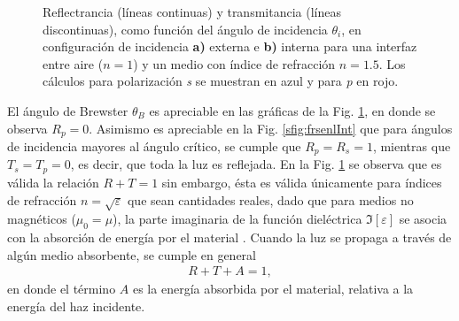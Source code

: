 \begin{figure}[h!]
\begin{subfigure}{.43\textwidth}
	\end{subfigure}\vspace*{-.7em}
	\caption{  Reflectrancia (líneas continuas) y transmitancia (líneas discontinuas), como función del ángulo de incidencia $\theta_i$, en configuración de incidencia \textbf{a)} externa e \textbf{b)} interna para una interfaz entre  aire ($n=1$) y un medio con índice de refracción $n = 1.5$. Los cálculos para polarización  \emph{s} se muestran  en azul y  para \emph{p} en rojo.}	\label{fig:frsnel}	
	\end{figure}	
%

El ángulo de Brewster $\theta_B$ es apreciable en las gráficas de la Fig. \ref{fig:frsnel}, en donde se observa $R_p = 0$. Asimismo es apreciable en la Fig. \ref{sfig:frsenlInt} que para ángulos de incidencia mayores al ángulo crítico, se cumple que $R_p = R_s = 1$, mientras que $T_s = T_p = 0$, es decir, que toda la luz es reflejada. En la Fig. \ref{fig:frsnel} se observa que es válida la relación $R + T = 1$ sin embargo, ésta es válida únicamente para índices de refracción $n = \sqrt{\varepsilon}$ que sean cantidades reales, dado que para medios no magnéticos ($\mu_0 = \mu$), la parte imaginaria de la función dieléctrica $\Im[\varepsilon]$ se asocia con la absorción de energía por el material \cite{ibach2003solid}. Cuando la luz se propaga a través de algún medio absorbente, se cumple en general 
	\begin{align*}
	R + T + A = 1,
	\end{align*}
en donde el término $A$ es la energía absorbida por el material, relativa a la energía del haz incidente.
	




